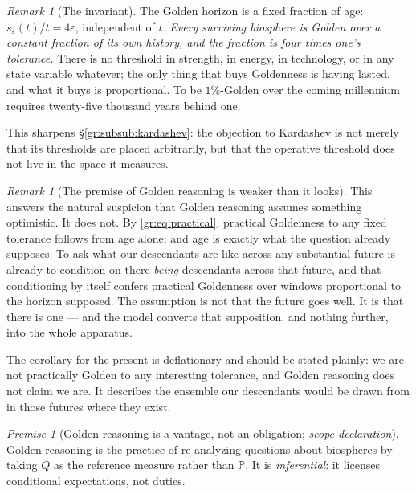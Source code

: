 \documentclass[11pt]{article}
\numberwithin{equation}{section}
\theoremstyle{plain}
\theoremstyle{definition}
\theoremstyle{remark}
\newtheorem{remark}[theorem]{Remark}
\newcommand{\PP}{\mathbb{P}}
\newtheorem{premise}{Premise}
\begin{document}
\begin{remark}[The invariant]\label{gr:rem:invariant}
The Golden horizon is a fixed fraction of age:
$s_\varepsilon(t)/t=4\varepsilon$, independent of $t$. \emph{Every
surviving biosphere is Golden over a constant fraction of its own
history, and the fraction is four times one's tolerance.} There is no
threshold in strength, in energy, in technology, or in any state
variable whatever; the only thing that buys Goldenness is having lasted,
and what it buys is proportional. To be $1\%$-Golden over the coming
millennium requires twenty-five thousand years behind one.

This sharpens \S\ref{gr:subsub:kardashev}: the objection to Kardashev is
not merely that its thresholds are placed arbitrarily, but that the
operative threshold does not live in the space it measures.
\end{remark}

\begin{remark}[The premise of Golden reasoning is weaker than it looks]
\label{gr:rem:weakpremise}
This answers the natural suspicion that Golden reasoning assumes
something optimistic. It does not. By \eqref{gr:eq:practical}, practical
Goldenness to any fixed tolerance follows from age alone; and age is
exactly what the question already supposes. To ask what our descendants
are like across any substantial future is already to condition on there
\emph{being} descendants across that future, and that conditioning by
itself confers practical Goldenness over windows proportional to the
horizon supposed. The assumption is not that the future goes well. It is
that there is one --- and the model converts that supposition, and
nothing further, into the whole apparatus.

The corollary for the present is deflationary and should be stated
plainly: we are not practically Golden to any interesting tolerance, and
Golden reasoning does not claim we are. It describes the ensemble our
descendants would be drawn from in those futures where they exist.
\end{remark}

\begin{premise}[Golden reasoning is a vantage, not an obligation;
\emph{scope declaration}]\label{gr:phi2}
Golden reasoning is the practice of re-analyzing questions about
biospheres by taking $Q$ as the reference measure rather than $\PP$. It
is \emph{inferential}: it licenses conditional expectations, not duties.
\end{premise}
\end{document}
